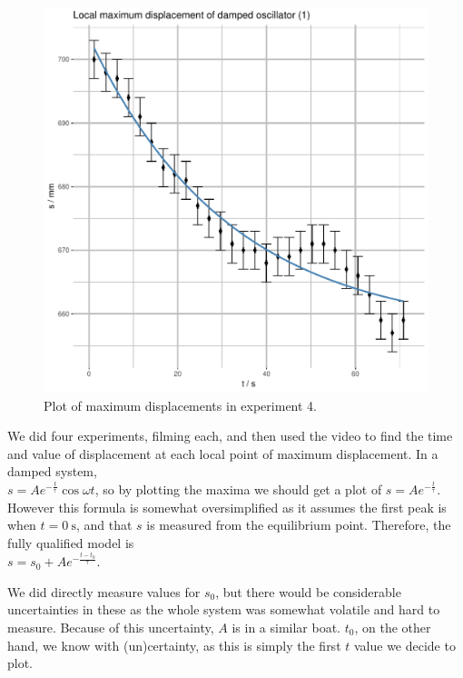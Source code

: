 \documentclass[a4paper,11pt]{article}
\begin{document}
\begin{figure}[H]
\begin{center}
\includegraphics[height=0.45\textheight,page=4]{Rplots.pdf}
\end{center}
\caption{Plot of maximum displacements in experiment 4.}
\label{fig:ex4}
\end{figure}

We did four experiments, filming each, and then used the video to find the time
and value of displacement at each local point of maximum displacement. In a
damped system,
\\$s  = Ae^{-\frac t\uptau} \cos \omega t$, so by plotting the maxima we should
get a plot of $s = Ae^{-\frac t\uptau}$. However this formula is somewhat
oversimplified as it assumes the first peak is when $t = \SI{0}{\second}$, and
that $s$ is measured from the equilibrium point. Therefore, the fully qualified
model is
\\$s = s_0 + Ae^{-\frac {t-t_0}\uptau}$.

We did directly measure values for $s_0$, but there would be considerable
uncertainties in these as the whole system was somewhat volatile and hard to
measure. Because of this uncertainty, $A$ is in a similar boat. $t_0$, on the
other hand, we know with (un)certainty, as this is simply the first $t$ value we
decide to plot.
\end{document}
